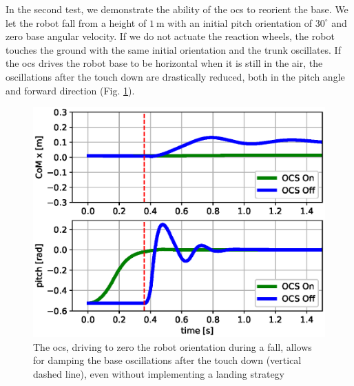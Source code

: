 \documentclass[letterpaper, 10 pt, conference]{ieeeconf}  %
\begin{document}
In the second test, we demonstrate the ability of the \gls{ocs} to reorient the base.
We let the robot fall from a height of $1 \ \mathrm{m}$ with an initial pitch orientation of $30^\circ$ and zero base angular velocity.
If we do not actuate the reaction wheels, the robot touches the ground with the same initial orientation and the trunk oscillates. If the \gls{ocs} drives the robot base to be horizontal when it is still in the air, the oscillations after the touch down are drastically reduced, both in the pitch angle and forward direction (Fig. \ref{fig:fall_plot}).
\begin{figure}
	\centering
	\includegraphics[width=1\linewidth]{figures/fall_plot.eps}
	\caption{\small The \gls{ocs}, driving to zero the robot orientation during a fall, allows for damping the base oscillations after the touch down (vertical dashed line), even without implementing a landing strategy}
	\label{fig:fall_plot}
\end{figure}


\end{document}
